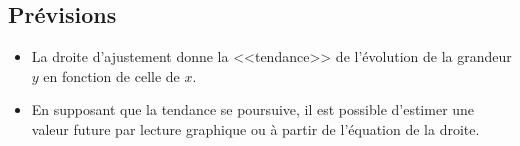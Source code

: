 \documentclass[12pt,a4paper]{article}
\begin{document}


\subsection{Prévisions}

\begin{myprop}
	\begin{itemize}
		\item La droite d'ajustement donne la <<tendance>> de l'évolution de la grandeur $y$ en fonction de celle de $x$.
		\item En supposant que la tendance se poursuive, il est possible d'estimer une valeur future par lecture graphique ou à partir de l'équation de la droite. 
	\end{itemize}
	
	 
\end{myprop}


\end{document}
